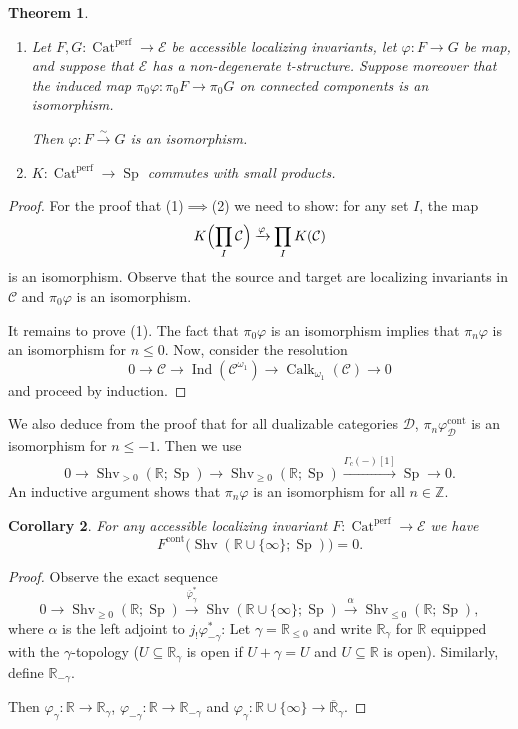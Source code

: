 \documentclass[draft]{amsart}
\newcommand{\ZZ}{\mathbb{Z}}
\newcommand{\RR}{\mathbb{R}}
\newcommand{\ol}[1]{\overline{#1}}
\newcommand{\cat}[1]{\mathcal{#1}}
\newcommand{\xto}[1]{\mathbin{\xrightarrow{#1}}}
\newcommand{\isoto}{\mathbin{\xrightarrow{\sim}}}
\newcommand{\blank}{-} %
\DeclareMathOperator{\Ind}{Ind}
\DeclareMathOperator{\Shv}{Shv}
\DeclareMathOperator{\Cat}{Cat}
\DeclareMathOperator{\Sp}{Sp}
\DeclareMathOperator{\Calk}{Calk}
\newtheorem{thm}{Theorem}[section]
\newtheorem{cor}[thm]{Corollary}
\theoremstyle{definition}
\begin{document}
\begin{thm}
\begin{enumerate}[(1)]
\item Let $F,G\colon \Cat^{\mathrm{perf}} \to \cat E$ be accessible localizing invariants, let $\varphi\colon F\to G$ be map, and suppose that $\cat E$ has a non-degenerate t-structure. Suppose moreover that the induced map $\pi_0\varphi\colon \pi_0F \to \pi_0G$ on connected components is an isomorphism.

Then $\varphi\colon F\isoto G$ is an isomorphism.

\item $K\colon \Cat^{\mathrm{perf}} \to \Sp$ commutes with small products.
\end{enumerate}
\end{thm}
\begin{proof}
For the proof that (1)$\implies$(2) we need to show: for any set $I$, the map
\[
K\Bigl(\prod_I \cat C\Bigr) \xto{\varphi} \prod_IK(\cat C)
\]
is an isomorphism. Observe that the source and target are localizing invariants in $\cat C$ and $\pi_0\varphi$ is an isomorphism.

It remains to prove (1). The fact that $\pi_0\varphi$ is an isomorphism implies that $\pi_n\varphi$ is an isomorphism for $n\le 0$. Now, consider the resolution
\[
0\to \cat C \to \Ind(\cat C^{\omega_1}) \to \Calk_{\omega_1}(\cat C) \to 0
\]
and proceed by induction.
\end{proof}

We also deduce from the proof that for all dualizable categories $\cat D$, $\pi_n\varphi^{\mathrm{cont}}_{\cat D}$ is an isomorphism for $n\le -1$. Then we use
\[
0\to \Shv_{>0}(\RR;\Sp) \to \Shv_{\ge0}(\RR;\Sp) \xrightarrow{\Gamma_c(\blank)[1]} \Sp \to 0.
\]
An inductive argument shows that $\pi_n\varphi$ is an isomorphism for all $n\in\ZZ$.

\begin{cor}
For any accessible localizing invariant $F\colon \Cat^{\mathrm{perf}} \to \cat E$ we have
\[
F^{\mathrm{cont}}\bigl(\Shv(\RR\cup\{\infty\}; \Sp)\bigr) = 0.
\]
\end{cor}
\begin{proof}
Observe the exact sequence
\[
0\to \Shv_{\ge0}(\RR;\Sp) \xto{\ol\varphi_\gamma^*} \Shv(\RR\cup \{\infty\}; \Sp) \xto{\alpha} \Shv_{\le 0}(\RR; \Sp),
\]
where $\alpha$ is the left adjoint to $j_!\varphi_{-\gamma}^*$: Let $\gamma = \RR_{\le 0}$ and write $\RR_{\gamma}$ for $\RR$ equipped with the $\gamma$-topology ($U \subseteq \RR_\gamma$ is open if $U + \gamma = U$ and $U\subseteq \RR$ is open). Similarly, define $\RR_{-\gamma}$.

Then $\varphi_\gamma \colon \RR\to \RR_{\gamma}$, $\varphi_{-\gamma} \colon \RR \to \RR_{-\gamma}$ and $\varphi_\gamma\colon \RR\cup\{\infty\} \to \ol{\RR}_\gamma$.
\end{proof}
\end{document}
